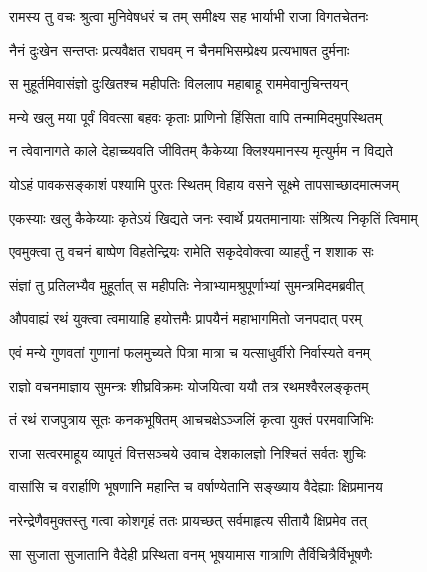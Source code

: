 
\twolineshloka
{रामस्य तु वचः श्रुत्वा मुनिवेषधरं च तम्}
{समीक्ष्य सह भार्याभी राजा विगतचेतनः} %

\twolineshloka
{नैनं दुःखेन सन्तप्तः प्रत्यवैक्षत राघवम्}
{न चैनमभिसम्प्रेक्ष्य प्रत्यभाषत दुर्मनाः} %

\twolineshloka
{स मुहूर्तमिवासंज्ञो दुःखितश्च महीपतिः}
{विललाप महाबाहू राममेवानुचिन्तयन्} %

\twolineshloka
{मन्ये खलु मया पूर्वं विवत्सा बहवः कृताः}
{प्राणिनो हिंसिता वापि तन्मामिदमुपस्थितम्} %

\twolineshloka
{न त्वेवानागते काले देहाच्च्यवति जीवितम्}
{कैकेय्या क्लिश्यमानस्य मृत्युर्मम न विद्यते} %

\twolineshloka
{योऽहं पावकसङ्काशं पश्यामि पुरतः स्थितम्}
{विहाय वसने सूक्ष्मे तापसाच्छादमात्मजम्} %

\twolineshloka
{एकस्याः खलु कैकेय्याः कृतेऽयं खिद्यते जनः}
{स्वार्थे प्रयतमानायाः संश्रित्य निकृतिं त्विमाम्} %

\twolineshloka
{एवमुक्त्वा तु वचनं बाष्पेण विहतेन्द्रियः}
{रामेति सकृदेवोक्त्वा व्याहर्तुं न शशाक सः} %

\twolineshloka
{संज्ञां तु प्रतिलभ्यैव मुहूर्तात् स महीपतिः}
{नेत्राभ्यामश्रुपूर्णाभ्यां सुमन्त्रमिदमब्रवीत्} %

\twolineshloka
{औपवाह्यं रथं युक्त्वा त्वमायाहि हयोत्तमैः}
{प्रापयैनं महाभागमितो जनपदात् परम्} %

\twolineshloka
{एवं मन्ये गुणवतां गुणानां फलमुच्यते}
{पित्रा मात्रा च यत्साधुर्वीरो निर्वास्यते वनम्} %

\twolineshloka
{राज्ञो वचनमाज्ञाय सुमन्त्रः शीघ्रविक्रमः}
{योजयित्वा ययौ तत्र रथमश्वैरलङ्कृतम्} %

\twolineshloka
{तं रथं राजपुत्राय सूतः कनकभूषितम्}
{आचचक्षेऽञ्जलिं कृत्वा युक्तं परमवाजिभिः} %

\twolineshloka
{राजा सत्वरमाहूय व्यापृतं वित्तसञ्चये}
{उवाच देशकालज्ञो निश्चितं सर्वतः शुचिः} %

\twolineshloka
{वासांसि च वरार्हाणि भूषणानि महान्ति च}
{वर्षाण्येतानि सङ्ख्याय वैदेह्याः क्षिप्रमानय} %

\twolineshloka
{नरेन्द्रेणैवमुक्तस्तु गत्वा कोशगृहं ततः}
{प्रायच्छत् सर्वमाहृत्य सीतायै क्षिप्रमेव तत्} %

\twolineshloka
{सा सुजाता सुजातानि वैदेही प्रस्थिता वनम्}
{भूषयामास गात्राणि तैर्विचित्रैर्विभूषणैः} %

